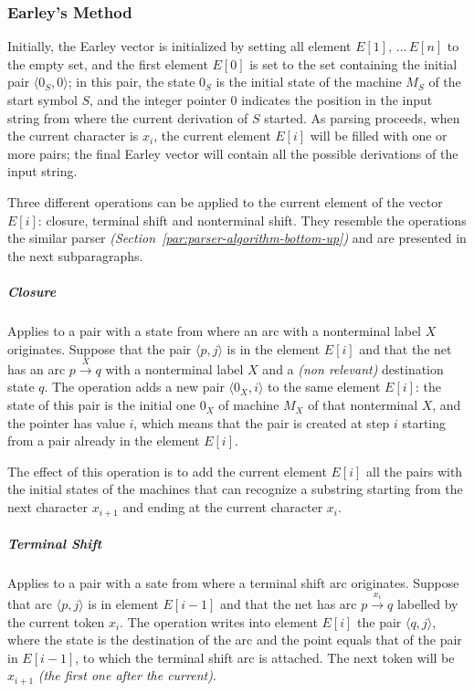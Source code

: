 \documentclass[english]{article}
\begin{document}
\subsubsection{Earley's Method}

Initially, the Earley vector is initialized by setting all element \(E[1], \, \ldots \, E[n]\) to the empty set, and the first element \(E[0]\) is set to the set containing the initial pair \(\langle 0_S, 0 \rangle\);
in this pair, the state \(0_S\) is the initial state of the machine \(M_S\) of the start symbol \(S\), and the integer pointer \(0\) indicates the position in the input string from where the current derivation of \(S\) started.
As parsing proceeds, when the current character is \(x_i\), the current element \(E[i]\) will be filled with one or more pairs;
the final Earley vector will contain all the possible derivations of the input string.

Three different operations can be applied to the current element of the vector \(E[i]\):
closure, terminal shift and nonterminal shift.
They resemble the operations the similar \elro parser \textit{(Section~\ref{par:parser-algorithm-bottom-up})} and are presented in the next subparagraphs.

\subparagraph*{Closure}

Applies to a pair with a state from where an arc with a nonterminal label \(X\) originates.
Suppose that the pair \(\langle p, j \rangle\) is in the element \(E[i]\) and that the net has an arc \(p \xrightarrow{X} q\) with a nonterminal label \(X\) and a \textit{(non relevant)} destination state \(q\).
The operation adds a new pair \(\langle 0_X, i \rangle\) to the same element \(E[i]\):
the state of this pair is the initial one \(0_X\) of machine \(M_X\) of that nonterminal \(X\), and the pointer has value \(i\), which means that the pair is created at step \(i\) starting from a pair already in the element \(E[i]\).

The effect of this operation is to add the current element \(E[i]\) all the pairs with the initial states of the machines that can recognize a substring starting from the next character \(x_{i+1}\) and ending at the current character \(x_i\).

\subparagraph*{Terminal Shift}

Applies to a pair with a sate from where a terminal shift arc originates.
Suppose that arc \(\langle p, j \rangle\) is in element \(E[i-1]\) and that the net has arc \(p \xrightarrow{x_i} q\) labelled by the current token \(x_i\).
The operation writes into element \(E[i]\) the pair \(\langle q, j \rangle\), where the state is the destination of the arc and the point equals that of the pair in \(E[i-1]\), to which the terminal shift arc is attached.
The next token will be \(x_{i+1}\) \textit{(the first one after the current)}.
\end{document}
